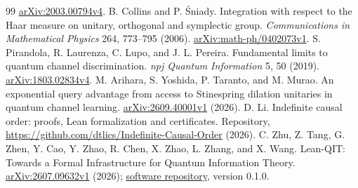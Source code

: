 \documentclass[11pt,letterpaper]{article}
\theoremstyle{definition}\newtheorem{definition}[theorem]{Definition}
\begin{document}
\begin{thebibliography}{99}
\href{https://arxiv.org/abs/2003.00794v4}{arXiv:2003.00794v4}.
 B. Collins and P. \'Sniady.
Integration with respect to the Haar measure on unitary, orthogonal and
symplectic group. \emph{Communications in Mathematical Physics}
264, 773--795 (2006).
\href{https://arxiv.org/abs/math-ph/0402073v1}{arXiv:math-ph/0402073v1}.
 S. Pirandola, R. Laurenza, C. Lupo, and J. L. Pereira.
Fundamental limits to quantum channel discrimination.
\emph{npj Quantum Information} 5, 50 (2019).
\href{https://arxiv.org/abs/1803.02834v4}{arXiv:1803.02834v4}.
 M. Arihara, S. Yoshida, P. Taranto, and M. Murao.
An exponential query advantage from access to Stinespring dilation unitaries in quantum channel learning.
\href{https://arxiv.org/abs/2609.40001v1}{arXiv:2609.40001v1} (2026).
 D. Li.
Indefinite causal order: proofs, Lean formalization and certificates. Repository,
\url{https://github.com/dtlics/Indefinite-Causal-Order} (2026).
 C. Zhu, Z. Tang, G. Zhen, Y. Cao, Y. Zhao, R. Chen,
X. Zhao, L. Zhang, and X. Wang.
Lean-QIT: Towards a Formal Infrastructure for Quantum Information Theory.
\href{https://arxiv.org/abs/2607.09632v1}{arXiv:2607.09632v1} (2026);
\href{https://github.com/QuAIR/Lean-QIT}{software repository}, version 0.1.0.
\end{thebibliography}
\end{document}
